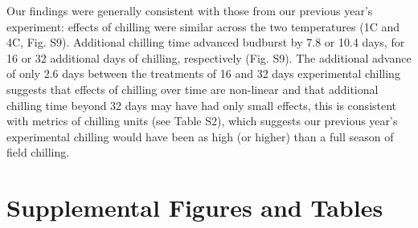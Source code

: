 \documentclass{article}
\begin{document}
\noindent Our findings were generally consistent with those from our previous year's experiment: effects of chilling were similar across the two temperatures (1\degree C and 4\degree C, Fig. S9). Additional chilling time advanced budburst by 7.8 or 10.4 days, for 16 or 32 additional days of chilling, respectively (Fig. S9). The additional advance of only 2.6 days between the treatments of 16 and 32 days experimental chilling suggests that effects of chilling over time are non-linear and that additional chilling time beyond 32 days may have had only small effects, this is consistent with metrics of chilling units (see Table S2), which suggests our previous year's experimental chilling would have been as high (or higher) than a full season of field chilling. 







\newpage
\section*{Supplemental Figures and Tables}
\end{document}

